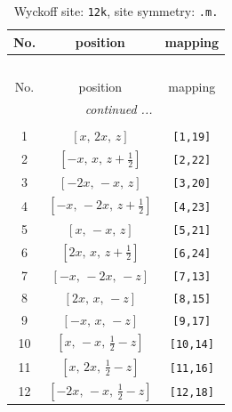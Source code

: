 \documentclass[fleqn,8pt]{jsarticle}
\begin{document}
\begin{longtable}{ccc}
\caption{Wyckoff site: {\tt 12k}, site symmetry: {\tt .m.}}
 \\
 \hline \hline
No. & position & mapping \\ \hline \endfirsthead

\multicolumn{2}{l}{\tablename\ \thetable{}} \\
 \hline \hline
No. & position & mapping \\ \hline \endhead

 \hline \hline
\multicolumn{2}{r}{\footnotesize\it continued ...} \\ \endfoot

 \hline \hline
\multicolumn{2}{r}{} \\ \endlastfoot

1 & $\left[ x,\, 2 x,\, z \right]$ & {\tt [1,19]} \\ \hline
2 & $\left[ - x,\, x,\, z + \frac{1}{2} \right]$ & {\tt [2,22]} \\ \hline
3 & $\left[ - 2 x,\, - x,\, z \right]$ & {\tt [3,20]} \\ \hline
4 & $\left[ - x,\, - 2 x,\, z + \frac{1}{2} \right]$ & {\tt [4,23]} \\ \hline
5 & $\left[ x,\, - x,\, z \right]$ & {\tt [5,21]} \\ \hline
6 & $\left[ 2 x,\, x,\, z + \frac{1}{2} \right]$ & {\tt [6,24]} \\ \hline
7 & $\left[ - x,\, - 2 x,\, - z \right]$ & {\tt [7,13]} \\ \hline
8 & $\left[ 2 x,\, x,\, - z \right]$ & {\tt [8,15]} \\ \hline
9 & $\left[ - x,\, x,\, - z \right]$ & {\tt [9,17]} \\ \hline
10 & $\left[ x,\, - x,\, \frac{1}{2} - z \right]$ & {\tt [10,14]} \\ \hline
11 & $\left[ x,\, 2 x,\, \frac{1}{2} - z \right]$ & {\tt [11,16]} \\ \hline
12 & $\left[ - 2 x,\, - x,\, \frac{1}{2} - z \right]$ & {\tt [12,18]} \\
\end{longtable}
\renewcommand{\arraystretch}{1.2}
\end{document}
